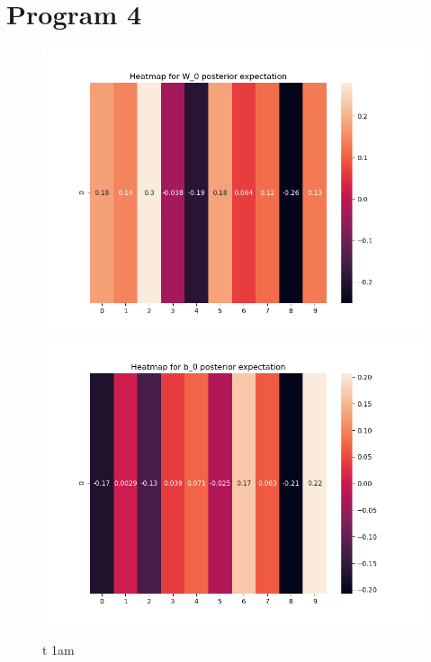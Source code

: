 \documentclass[10pt]{homeworg}
\begin{document}
\section{Program 4}
\begin{figure}[!htbp]
    \centering
    \begin{minipage}{0.45\textwidth}
        \centering
       \includegraphics[scale=0.5]{figures/heatmap_exp_W_0.png}
    \end{minipage}\hfill
    \begin{minipage}{0.45\textwidth}
        \centering
        \includegraphics[scale=0.5]{figures/heatmap_exp_b_0.png}
    \end{minipage}t 1am
\end{figure}
\end{document}
